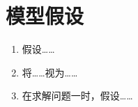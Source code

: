 \section{模型假设}

\begin{enumerate}[label=\arabic*., leftmargin=2.5em, labelsep=0.6em]
  \item 假设……
  \item 将……视为……
  \item 在求解问题一时，假设……
\end{enumerate}
